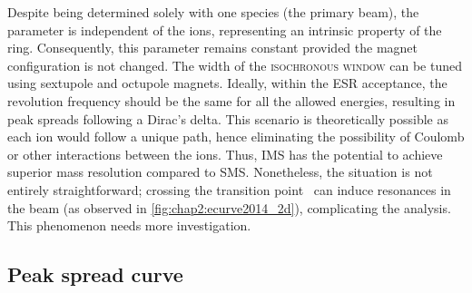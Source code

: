 \newpar
Despite being determined solely with one species (the primary beam), the parameter is independent of the ions, representing an intrinsic property of the ring. Consequently, this parameter remains constant provided the magnet configuration is not changed. The width of the \textsc{isochronous window} can be tuned using sextupole and octupole magnets. Ideally, within the \textsc{ESR} acceptance, the revolution frequency should be the same for all the allowed energies, resulting in peak spreads following a Dirac's delta. This scenario is theoretically possible as each ion would follow a unique path, hence eliminating the possibility of Coulomb or other interactions between the ions. Thus, \textsc{IMS} has the potential to achieve superior mass resolution compared to \textsc{SMS}. Nonetheless, the situation is not entirely straightforward; crossing the transition point~\cite{transitioncrossing} can induce resonances in the beam (as observed in \cref{fig:chap2:ecurve2014_2d}), complicating the analysis. This phenomenon needs more investigation.

\subsection{Peak spread curve}\label{subsec:chap2:isocurve}

